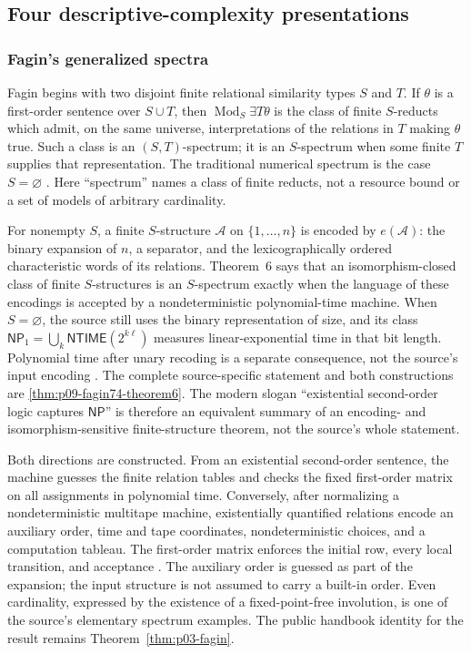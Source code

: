 
\subsection{Four descriptive-complexity presentations}
\label{sec:p09-presentation-n-c-004}

\subsubsection{Fagin's generalized spectra}

Fagin begins with two disjoint finite relational similarity types \(S\) and
\(T\).  If \(\theta\) is a first-order sentence over \(S\cup T\), then
\(\operatorname{Mod}_{S}\exists T\theta\) is the class of finite
\(S\)-reducts which admit, on the same universe, interpretations of the
relations in \(T\) making \(\theta\) true.  Such a class is an
\((S,T)\)-spectrum; it is an \(S\)-spectrum when some finite \(T\) supplies
that representation.  The traditional numerical spectrum is the case
\(S=\varnothing\) \cite[pp.~48--49]{Fagin1974}.  Here ``spectrum'' names a
class of finite reducts, not a resource bound or a set of models of arbitrary
cardinality.

For nonempty \(S\), a finite \(S\)-structure \(\mathcal A\) on
\(\{1,\ldots,n\}\) is encoded by \(e(\mathcal A)\): the binary expansion of
\(n\), a separator, and the lexicographically ordered characteristic words of
its relations.  Theorem~6 says that an isomorphism-closed class of finite
\(S\)-structures is an \(S\)-spectrum exactly when the language of these
encodings is accepted by a nondeterministic polynomial-time machine.  When
\(S=\varnothing\), the source still uses the binary representation of size,
and its class \(\mathsf{NP}_1=\bigcup_k\mathsf{NTIME}(2^{k\ell})\)
measures linear-exponential time in that bit length. Polynomial time after
unary recoding is a separate consequence, not the source's input encoding
\cite[pp.~51--54]{Fagin1974}. The complete source-specific statement and
both constructions are \cref{thm:p09-fagin74-theorem6}. The modern slogan
``existential second-order logic captures \(\mathsf{NP}\)'' is therefore an
equivalent summary of an encoding- and isomorphism-sensitive finite-structure
theorem, not the source's whole statement.

Both directions are constructed.  From an existential second-order sentence,
the machine guesses the finite relation tables and checks the fixed first-order
matrix on all assignments in polynomial time.  Conversely, after normalizing a
nondeterministic multitape machine, existentially quantified relations encode
an auxiliary order, time and tape coordinates, nondeterministic choices, and a
computation tableau.  The first-order matrix enforces the initial row, every
local transition, and acceptance \cite[pp.~53--58]{Fagin1974}. The auxiliary
order is guessed as part of the expansion; the input structure is not assumed
to carry a built-in order.  Even cardinality, expressed by the existence of a
fixed-point-free involution, is one of the source's elementary spectrum
examples.  The public handbook identity for the result remains
Theorem~\ref{thm:p03-fagin}.

